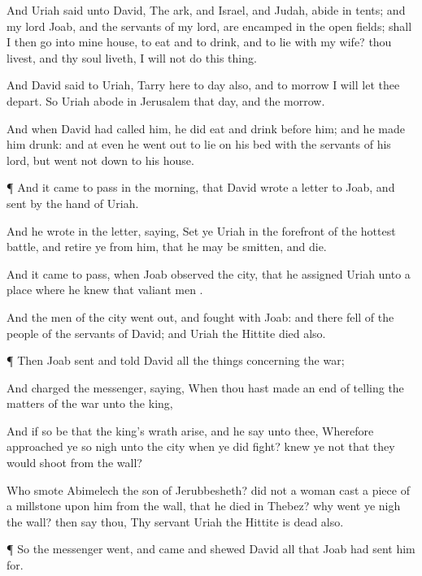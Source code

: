 {And
Uriah
said unto
David, The
ark, and
Israel, and
Judah,
abide in
tents; and my
lord
Joab, and the
servants of my
lord, are
encamped in the
open
fields; shall
I then
go into mine
house, to
eat and to
drink, and to
lie with my
wife?
{} thou
livest, and
{} thy
soul
liveth, I will not
do this
thing.

And
David
said to
Uriah,
Tarry here to
day also, and to
morrow I will let thee
depart. So
Uriah
abode in
Jerusalem that
day, and the
morrow.

And when
David had
called him, he did
eat and
drink
before him; and he made him
drunk: and at
even he went
out to
lie on his
bed with the
servants of his
lord, but went not
down to his
house.


\par }{\PP {}¶ And it came to pass in the
morning, that
David
wrote a
letter to
Joab, and
sent
{} by the
hand of
Uriah.

And he
wrote in the
letter,
saying,
Set ye
Uriah in the
forefront of the
hottest
battle, and
retire ye from
him, that he may be
smitten, and
die.

And it came to pass, when
Joab
observed the
city, that he
assigned
Uriah unto a
place where he
knew that
valiant
men
{}.

And the
men of the
city went
out, and
fought with
Joab: and there
fell
{} of the
people of the
servants of
David; and
Uriah the
Hittite
died also.


\par }{\PP {}¶ Then
Joab
sent and
told
David all the
things concerning the
war;

And
charged the
messenger,
saying, When thou hast made an
end of
telling the
matters of the
war unto the
king,

And if so be that the
king’s
wrath
arise, and he
say unto thee, Wherefore approached ye so
nigh unto the
city when ye did
fight?
knew ye not that they would
shoot from the
wall?

Who
smote
Abimelech the
son of
Jerubbesheth? did not a
woman
cast a
piece of a
millstone upon him from the
wall, that he
died in
Thebez? why went ye
nigh the
wall? then
say thou, Thy
servant
Uriah the
Hittite is
dead also.


\par }{\PP {}¶ So the
messenger
went, and
came and
shewed
David all that
Joab had
sent him for.

}

